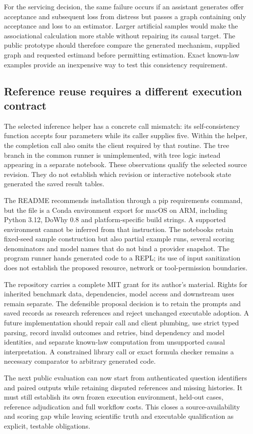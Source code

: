 For the servicing decision, the same failure occurs if an assistant generates
offer acceptance and subsequent loss from distress but passes a graph containing
only acceptance and loss to an estimator. Larger artificial samples would make
the associational calculation more stable without repairing its causal target.
The public prototype should therefore compare the generated mechanism, supplied
graph and requested estimand before permitting estimation. Exact known-law
examples provide an inexpensive way to test this consistency requirement.

\subsection{Reference reuse requires a different execution contract}
\label{exec21:prophetsrepo-reuse}
The selected inference helper has a concrete call mismatch: its self-consistency
function accepts four parameters while its caller supplies five. Within the
helper, the completion call also omits the client required by that routine.
The tree branch in the common runner is unimplemented, with tree logic instead
appearing in a separate notebook. These observations qualify the selected
source revision. They do not establish which revision or interactive notebook
state generated the saved result tables.~\citep{exec21_prophets_repo}

The README recommends installation through a pip requirements command, but the
file is a Conda environment export for macOS on ARM, including Python 3.12,
DoWhy 0.8 and platform-specific build strings. A supported environment cannot
be inferred from that instruction. The notebooks retain fixed-seed sample
construction but also partial example runs, several scoring denominators and
model names that do not bind a provider snapshot. The program runner hands
generated code to a REPL; its use of input sanitization does not establish the
proposed resource, network or tool-permission boundaries.
\citep{exec21_prophets_repo}

The repository carries a complete MIT grant for its author's material. Rights
for inherited benchmark data, dependencies, model access and downstream uses
remain separate. The defensible proposal decision is to retain the prompts
and saved records as research references and reject unchanged executable
adoption. A future implementation should repair call and client plumbing,
use strict typed parsing, record invalid outcomes and retries, bind dependency
and model identities, and separate known-law computation from unsupported
causal interpretation. A constrained library call or exact formula checker
remains a necessary comparator to arbitrary generated code.
\citep{exec21_prophets_repo}

The next public evaluation can now start from authenticated question identifiers
and paired outputs while retaining disputed references and missing histories.
It must still establish its own frozen execution environment, held-out cases,
reference adjudication and full workflow costs. This closes a source-availability
and scoring gap while leaving scientific truth and executable qualification as
explicit, testable obligations.
